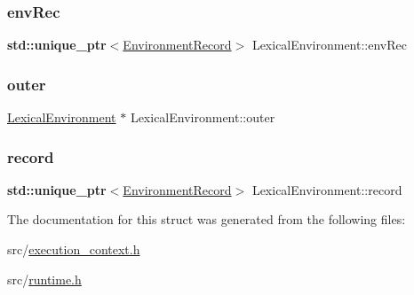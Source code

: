 \subsubsection{\texorpdfstring{env\+Rec}{envRec}}
{\footnotesize\ttfamily \textbf{ std\+::unique\+\_\+ptr}$<$\hyperlink{struct_environment_record}{Environment\+Record}$>$ Lexical\+Environment\+::env\+Rec}

\mbox{\label{struct_lexical_environment_a355543b6ca29aacdde230fdbc97cc23e}} 
\subsubsection{\texorpdfstring{outer}{outer}}
{\footnotesize\ttfamily \hyperlink{struct_lexical_environment}{Lexical\+Environment} $\ast$ Lexical\+Environment\+::outer}

\mbox{\label{struct_lexical_environment_a8cbbf5a6ba52bd6bc9d18a1405a27f93}} 
\subsubsection{\texorpdfstring{record}{record}}
{\footnotesize\ttfamily \textbf{ std\+::unique\+\_\+ptr}$<$\hyperlink{struct_environment_record}{Environment\+Record}$>$ Lexical\+Environment\+::record}



The documentation for this struct was generated from the following files\+:\begin{DoxyCompactItemize}
\item 
src/\hyperlink{execution__context_8h}{execution\+\_\+context.\+h}\item 
src/\hyperlink{runtime_8h}{runtime.\+h}\end{DoxyCompactItemize}
